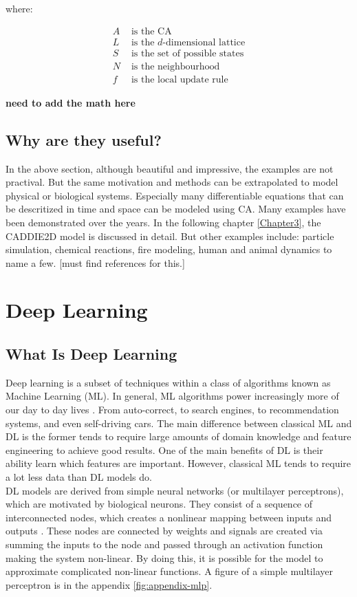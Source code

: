 where:

\begin{align*}
	A &  \text{ is the CA} \\
	L &  \text{ is the } d \text{-dimensional lattice} \\
	S &  \text{ is the set of possible states} \\
	N &  \text{ is the neighbourhood} \\
	f &  \text{ is the local update rule}
\end{align*}

\textbf{need to add the math here}
\subsection{Why are they useful?}
In the above section, although beautiful and impressive, the examples are not practival. But the same motivation and methods can be extrapolated to model physical or biological systems. Especially many differentiable equations that can be descritized in time and space can be modeled using CA. Many examples have been demonstrated over the years. In the following chapter \ref{Chapter3}, the CADDIE2D model is discussed in detail. But other examples include: particle simulation, chemical reactions, fire modeling, human and animal dynamics to name a few. [must find references for this.]

\section{Deep Learning}
\subsection{What Is Deep Learning}

Deep learning is a subset of techniques within a class of algorithms known as Machine Learning (ML). In general, ML algorithms power increasingly more of our day to day lives \cite{lecun2015deep}. From auto-correct, to search engines, to recommendation systems, and even self-driving cars. The main difference between classical ML and DL is the former tends to require large amounts of domain knowledge and feature engineering to achieve good results. One of the main benefits of DL is their ability learn which features are important. However, classical ML tends to require a lot less data than DL models do. \\

 DL models are derived from simple neural networks (or multilayer perceptrons), which are motivated by biological neurons. They consist of a sequence of interconnected nodes, which creates a nonlinear mapping between inputs and outputs \cite{gardner1998artificial}. These nodes are connected by weights and signals are created via summing the inputs to the node and passed through an activation function making the system non-linear. By doing this, it is possible for the model to approximate complicated non-linear functions. A figure of a simple multilayer perceptron is in the appendix \ref{fig:appendix-mlp}. \\
 
